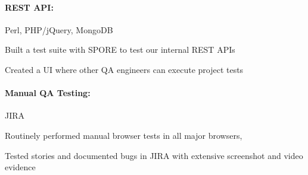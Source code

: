 \begin{position}
  \paragraph{REST API:} Perl, PHP/jQuery, MongoDB
  \begin{myitem}
  \item Built a test suite with SPORE to test our internal REST APIs
  \item Created a UI where other QA engineers can execute project tests
  \end{myitem}
%
  \paragraph{Manual QA Testing:} JIRA
  \begin{myitem}
  \item Routinely performed manual browser tests in all major browsers,
  \item Tested stories and documented bugs in JIRA with extensive screenshot and video evidence
  \end{myitem}
\end{position}
